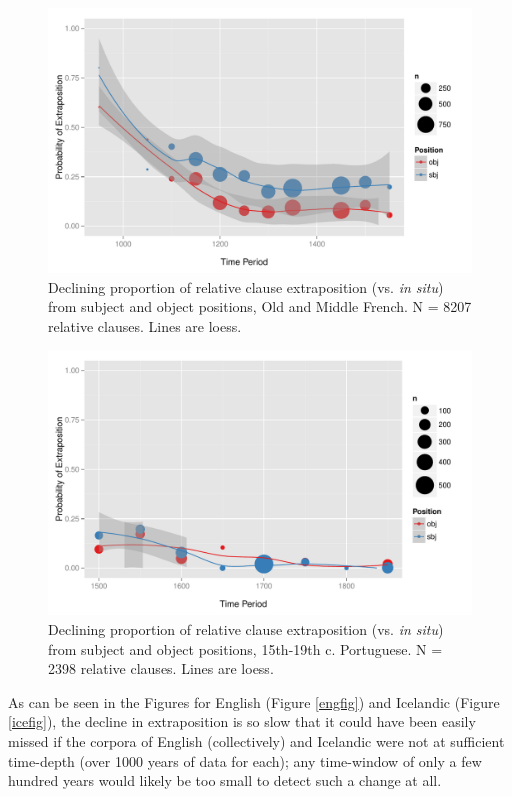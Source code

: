 \begin{figure}
  \includegraphics[width=1.1\textwidth]{stableVarTalks/exSbjObjYearBinned50Loessfre.pdf}
\caption{Declining proportion of relative clause extraposition (vs. \textsl{in situ}) from subject and object positions, Old and Middle French. N = 8207 relative clauses. Lines are loess.}
\label{frefig}       
\end{figure}

\begin{figure}
  \includegraphics[width=1.1\textwidth]{stableVarTalks/exSbjObjYearBinned50Loessport.pdf}
\caption{Declining proportion of relative clause extraposition (vs. \textsl{in situ}) from subject and object positions, 15th-19th c. Portuguese. N = 2398 relative clauses. Lines are loess.}
\label{frefig}       
\end{figure}



As can be seen in the Figures for English (Figure \ref{engfig}) and Icelandic (Figure \ref{icefig}), the decline in extraposition is so slow that it could have been easily missed if the corpora of English (collectively) and Icelandic were not at sufficient time-depth (over 1000 years of data for each); any time-window of only a few hundred years would likely be too small to detect such a change at all.

